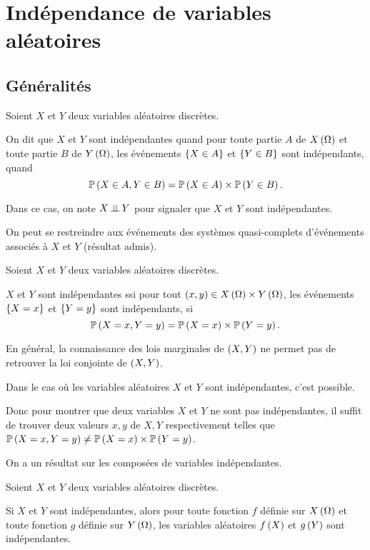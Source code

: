 \section{Indépendance de variables aléatoires}

\subsection{Généralités}

\begin{defi}
Soient \(X\) et \(Y\) deux variables aléatoires discrètes.

On dit que \(X\) et \(Y\) sont indépendantes quand pour toute partie \(A\) de \(X\left(\Omega\right)\) et toute partie \(B\) de \(Y\left(\Omega\right)\), les événements \(\left\lbrace X\in A\right\rbrace\) et \(\left\lbrace Y\in B\right\rbrace\) sont indépendants, \ie quand \[\mathbb{P}\left(X\in A,Y\in B\right)=\mathbb{P}\left(X\in A\right)\times\mathbb{P}\left(Y\in B\right).\]
\end{defi}

Dans ce cas, on note \(X\operatorname{\perp\!\!\!\perp} Y\) pour signaler que \(X\) et \(Y\) sont indépendantes.

On peut se restreindre aux événements des systèmes quasi-complets d'événements associés à \(X\) et \(Y\) (résultat admis).

\begin{prop}
Soient \(X\) et \(Y\) deux variables aléatoires discrètes.

\(X\) et \(Y\) sont indépendantes ssi pour tout \(\left(x,y\right)\in X\left(\Omega\right)\times Y\left(\Omega\right)\), les événements \(\left\lbrace X=x\right\rbrace\) et \(\left\lbrace Y=y\right\rbrace\) sont indépendants, \ie si \[\mathbb{P}\left(X=x,Y=y\right)=\mathbb{P}\left(X=x\right)\times\mathbb{P}\left(Y=y\right).\]
\end{prop}

\begin{rem}
En général, la connaissance des lois marginales de \(\left(X,Y\right)\) ne permet pas de retrouver la loi conjointe de \(\left(X,Y\right)\).

Dans le cas où les variables aléatoires \(X\) et \(Y\) sont indépendantes, c'est possible.

Donc pour montrer que deux variables \(X\) et \(Y\) ne sont pas indépendantes, il suffit de trouver deux valeurs \(x,y\) de \(X,Y\) respectivement telles que \(\mathbb{P}\left(X=x,Y=y\right)\not=\mathbb{P}\left(X=x\right)\times\mathbb{P}\left(Y=y\right)\).
\end{rem}

On a un résultat sur les composées de variables indépendantes.

\begin{prop}
Soient \(X\) et \(Y\) deux variables aléatoires discrètes.

Si \(X\) et \(Y\) sont indépendantes, alors pour toute fonction \(f\) définie sur \(X\left(\Omega\right)\) et toute fonction \(g\) définie sur \(Y\left(\Omega\right)\), les variables aléatoires \(f\left(X\right)\) et \(g\left(Y\right)\) sont indépendantes.
\end{prop}

